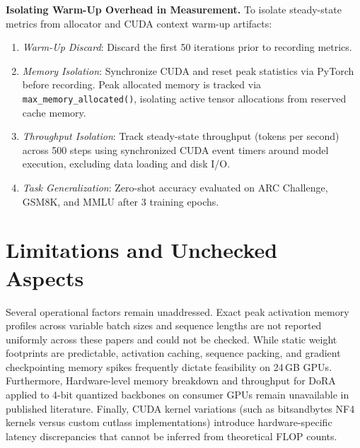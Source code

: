 \documentclass[11pt,a4paper]{article}
\begin{document}
\textbf{Isolating Warm-Up Overhead in Measurement.} To isolate steady-state metrics from allocator and CUDA context warm-up artifacts:
\begin{enumerate}
    \item \textit{Warm-Up Discard}: Discard the first 50 iterations prior to recording metrics.
    \item \textit{Memory Isolation}: Synchronize CUDA and reset peak statistics via PyTorch before recording. Peak allocated memory is tracked via \texttt{max\_memory\_allocated()}, isolating active tensor allocations from reserved cache memory.
    \item \textit{Throughput Isolation}: Track steady-state throughput (tokens per second) across 500 steps using synchronized CUDA event timers around model execution, excluding data loading and disk I/O.
    \item \textit{Task Generalization}: Zero-shot accuracy evaluated on ARC Challenge, GSM8K, and MMLU after 3 training epochs.
\end{enumerate}

\section{Limitations and Unchecked Aspects}

Several operational factors remain unaddressed. Exact peak activation memory profiles across variable batch sizes and sequence lengths are not reported uniformly across these papers and could not be checked. While static weight footprints are predictable, activation caching, sequence packing, and gradient checkpointing memory spikes frequently dictate feasibility on 24\,GB GPUs. Furthermore, Hardware-level memory breakdown and throughput for DoRA applied to 4-bit quantized backbones on consumer GPUs remain unavailable in published literature. Finally, CUDA kernel variations (such as bitsandbytes NF4 kernels versus custom cutlass implementations) introduce hardware-specific latency discrepancies that cannot be inferred from theoretical FLOP counts.



\end{document}
